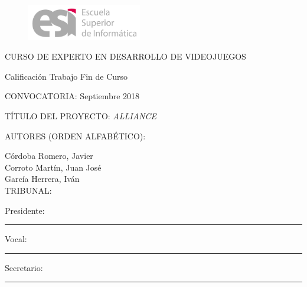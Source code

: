 \setlength{\parskip}{0mm}

\begin{figure}[htb]
\includegraphics[width=5cm]{./images/LogoESILetras.jpg}
\end{figure}

\begin{center}
CURSO DE EXPERTO EN DESARROLLO DE VIDEOJUEGOS 
\vspace*{0.1in}

\begin{LARGE}Calificación Trabajo Fin de Curso\end{LARGE}
\end{center}

\vspace*{0.2in}

CONVOCATORIA: \hspace*{2.5in} Septiembre 2018 
\vspace*{0.1in}

TÍTULO DEL PROYECTO: \hspace*{1.9in} \textit{ALLIANCE}
\vspace*{0.1in}

AUTORES (ORDEN ALFABÉTICO):
\vspace*{0.1in}

\hspace*{0.5in}Córdoba Romero, Javier \\
\hspace*{0.5in}Corroto Martín, Juan José\\
\hspace*{0.5in}García Herrera, Iván\\

\vspace*{0.2in}
TRIBUNAL:
\vspace*{0.1in}

\hspace*{0.5in}Presidente: \hspace*{0.15in} \rule{100mm}{0.1mm}
\vspace*{0.1in}

\hspace*{0.5in}Vocal: \hspace*{0.47in} \rule{100mm}{0.1mm}
\vspace*{0.1in}


\hspace*{0.5in}Secretario: \hspace*{0.18in} \rule{100mm}{0.1mm}
\vspace*{0.1in}

